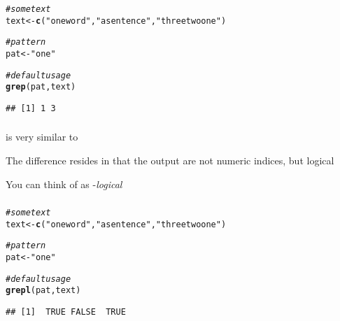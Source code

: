 \documentclass[12pt]{beamer}\usepackage[]{graphicx}\usepackage[]{color}
\makeatletter
\newcommand{\hlstr}[1]{\textcolor[rgb]{0.192,0.494,0.8}{#1}}%
\newcommand{\hlcom}[1]{\textcolor[rgb]{0.678,0.584,0.686}{\textit{#1}}}%
\newcommand{\hlstd}[1]{\textcolor[rgb]{0.345,0.345,0.345}{#1}}%
\newcommand{\hlkwb}[1]{\textcolor[rgb]{0.69,0.353,0.396}{#1}}%
\newcommand{\hlkwd}[1]{\textcolor[rgb]{0.737,0.353,0.396}{\textbf{#1}}}%
\newenvironment{kframe}{%
 \def\at@end@of@kframe{}%
 \ifinner\ifhmode%
  \def\at@end@of@kframe{\end{minipage}}%
  \begin{minipage}{\columnwidth}%
 \fi\fi%
 \def\FrameCommand##1{\hskip\@totalleftmargin \hskip-\fboxsep
 \colorbox{shadecolor}{##1}\hskip-\fboxsep
     \hskip-\linewidth \hskip-\@totalleftmargin \hskip\columnwidth}%
 \MakeFramed {\advance\hsize-\width
   \@totalleftmargin\z@ \linewidth\hsize
   \@setminipage}}%
 {\par\unskip\endMakeFramed%
 \at@end@of@kframe}
\newenvironment{knitrout}{}{} %
\makeatother
\begin{document}
\begin{frame}[fragile]
\frametitle{}

\begin{knitrout}\footnotesize
{}\color{fgcolor}\begin{kframe}
\begin{alltt}
\hlcom{# some text}
\hlstd{text} \hlkwb{<-} \hlkwd{c}\hlstd{(}\hlstr{"one word"}\hlstd{,} \hlstr{"a sentence"}\hlstd{,} \hlstr{"three two one"}\hlstd{)}

\hlcom{# pattern}
\hlstd{pat} \hlkwb{<-} \hlstr{"one"}

\hlcom{# default usage}
\hlkwd{grep}\hlstd{(pat, text)}
\end{alltt}
\begin{verbatim}
## [1] 1 3
\end{verbatim}
\end{kframe}
\end{knitrout}

\end{frame}


\begin{frame}[fragile]
\frametitle{}

\bbi
  \item {} is very similar to 
  \item The difference resides in that the output are not numeric indices, but logical
  \item You can think of  as -\textit{logical}
\ei

\end{frame}


\begin{frame}[fragile]
\frametitle{}

\begin{knitrout}\footnotesize
{}\color{fgcolor}\begin{kframe}
\begin{alltt}
\hlcom{# some text}
\hlstd{text} \hlkwb{<-} \hlkwd{c}\hlstd{(}\hlstr{"one word"}\hlstd{,} \hlstr{"a sentence"}\hlstd{,} \hlstr{"three two one"}\hlstd{)}

\hlcom{# pattern}
\hlstd{pat} \hlkwb{<-} \hlstr{"one"}

\hlcom{# default usage}
\hlkwd{grepl}\hlstd{(pat, text)}
\end{alltt}
\begin{verbatim}
## [1]  TRUE FALSE  TRUE
\end{verbatim}
\end{kframe}
\end{knitrout}

\end{frame}
\end{document}
